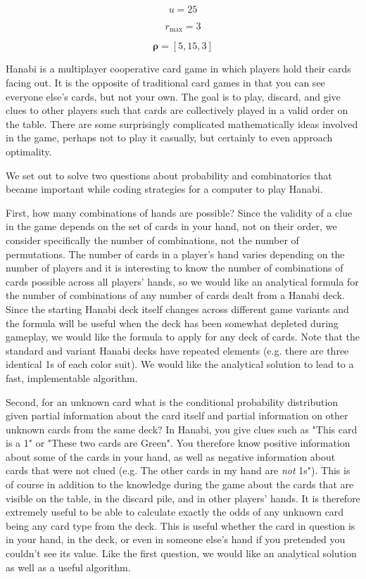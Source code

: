 \documentclass{article}
\begin{document}
\begin{equation}\nonumber
    u = 25
\end{equation}

\begin{equation}\nonumber
    r_{\max} = 3
\end{equation}

\begin{equation}\nonumber
    \bm{\rho} = [5, 15, 3]
\end{equation}

Hanabi is a multiplayer cooperative card game in which players hold their cards facing out. It is the opposite of traditional card games in that you can see everyone else's cards, but not your own. The goal is to play, discard, and give clues to other players such that cards are collectively played in a valid order on the table. There are some surprisingly complicated mathematically ideas involved in the game, perhaps not to play it casually, but certainly to even approach optimality.

We set out to solve two questions about probability and combinatorics that became important while coding strategies for a computer to play Hanabi. 

First, how many combinations of hands are possible? Since the validity of a clue in the game depends on the set of cards in your hand, not on their order, we consider specifically the number of combinations, not the number of permutations. The number of cards in a player's hand varies depending on the number of players and it is interesting to know the number of combinations of cards possible across all players' hands, so we would like an analytical formula for the number of combinations of any number of cards dealt from a Hanabi deck. Since the starting Hanabi deck itself changes across different game variants and the formula will be useful when the deck has been somewhat depleted during gameplay, we would like the formula to apply for any deck of cards. Note that the standard and variant Hanabi decks have repeated elements (e.g. there are three identical 1s of each color suit). We would like the analytical solution to lead to a fast, implementable algorithm.

Second, for an unknown card what is the conditional probability distribution given partial information about the card itself and partial information on other unknown cards from the same deck? In Hanabi, you give clues such as "This card is a 1" or "These two cards are Green". You therefore know positive information about some of the cards in your hand, as well as negative information about cards that were not clued (e.g. The other cards in my hand are \emph{not} 1s"). This is of course in addition to the knowledge during the game about the cards that are visible on the table, in the discard pile, and in other players' hands. It is therefore extremely useful to be able to calculate exactly the odds of any unknown card being any card type from the deck. This is useful whether the card in question is in your hand, in the deck, or even in someone else's hand if you pretended you couldn't see its value. Like the first question, we would like an analytical solution as well as a useful algorithm.
\end{document}
